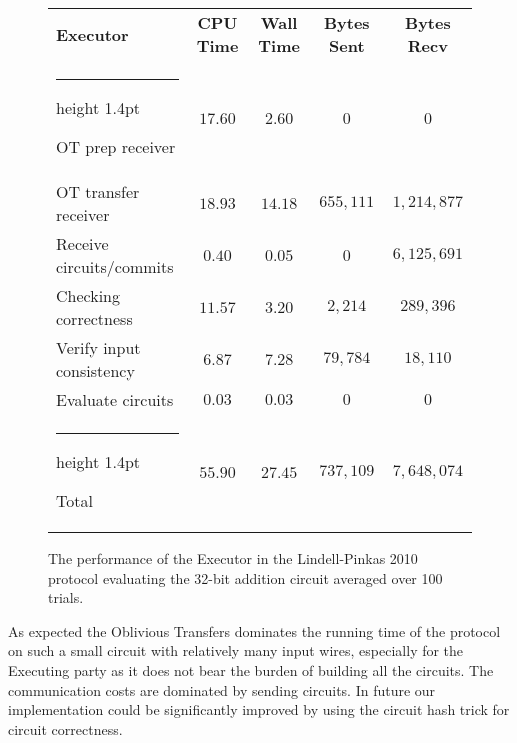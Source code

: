 \documentclass[11pt]{article} %
\makeatletter
\newcommand{\thickhline}{%
    \noalign {\ifnum 0=`}\fi \hrule height 1.4pt
    \futurelet \reserved@a \@xhline
}
\makeatother
\begin{document}
				\begin{figure}[!ht]
					\begin{tabular}{| p{4.3cm} | c c c c |}
						\hline
						\textbf{Executor} & \textbf{CPU Time} & \textbf{Wall Time} & \textbf{Bytes Sent} & \textbf{Bytes Recv} \\
						\thickhline
						OT prep receiver & $17.60$ & $2.60$ & $0$ & $0$ \\
						\hline
						OT transfer receiver & $18.93$ & $14.18$ & $655,111$ & $1,214,877$ \\
						\hline
						Receive circuits/commits & $0.40$ & $0.05$ & $0$ & $6,125,691$ \\
						\hline
						Checking correctness & $11.57$ & $3.20$ & $2,214$ & $289,396$ \\
						\hline
						Verify input consistency & $6.87$ & $7.28$ & $79,784$ & $18,110$ \\
						\hline
						Evaluate circuits & $0.03$ & $0.03$ & $0$ & $0$ \\
						\thickhline
						Total & $55.90$ & $27.45$ & $737,109$ & $7,648,074$ \\
						\hline
					\end{tabular}
					\caption{The performance of the Executor in the Lindell-Pinkas 2010 protocol evaluating the 32-bit addition circuit averaged over 100 trials.\label{table:LP_2010_Add_Executor}}
				\end{figure}
				\FloatBarrier

				As expected the Oblivious Transfers dominates the running time of the protocol on such a small circuit with relatively many input wires, especially for the Executing party as it does not bear the burden of building all the circuits. The communication costs are dominated by sending circuits. In future our implementation could be significantly improved by using the circuit hash trick for circuit correctness.\\
\end{document}
